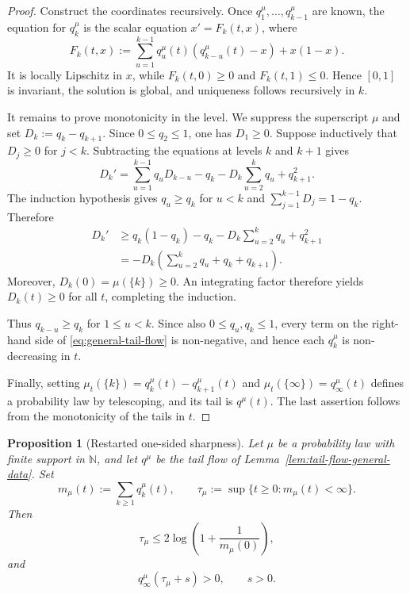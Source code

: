 \documentclass[11pt,a4paper]{amsart}
\newtheorem{proposition}[theorem]{Proposition}
\theoremstyle{remark}
\newcommand{\N}{\mathbb N}
\begin{document}
\begin{proof}
Construct the coordinates recursively. Once
$q_1^\mu,\ldots,q_{k-1}^\mu$ are known, the equation for $q_k^\mu$ is the
scalar equation $x'=F_k(t,x)$, where
\[
        F_k(t,x)
        :=
        \sum_{u=1}^{k-1}q_u^\mu(t)
        (q_{k-u}^\mu(t)-x)+x(1-x).
\]
It is locally Lipschitz in $x$, while
$F_k(t,0)\geq0$ and $F_k(t,1)\leq0$. Hence $[0,1]$ is invariant, the
solution is global, and uniqueness follows recursively in $k$.

It remains to prove monotonicity in the level. We suppress the superscript
$\mu$ and set $D_k:=q_k-q_{k+1}$. Since $0\leq q_2\leq1$, one has
$D_1\geq0$. Suppose inductively that $D_j\geq0$ for $j<k$. Subtracting
the equations at levels $k$ and $k+1$ gives
\[
        D_k'
        =
        \sum_{u=1}^{k-1}q_uD_{k-u}
        -q_k
        -D_k\sum_{u=2}^{k}q_u
        +q_{k+1}^2.
\]
The induction hypothesis gives \(q_u\geq q_k\) for \(u<k\) and
\(\sum_{j=1}^{k-1}D_j=1-q_k\). Therefore
\[
\begin{aligned}
D_k'
&\geq
q_k(1-q_k)-q_k
-D_k\sum_{u=2}^{k}q_u+q_{k+1}^2 \\
&=
-D_k\left(
\sum_{u=2}^{k}q_u+q_k+q_{k+1}\right).
\end{aligned}
\]
Moreover,
\(D_k(0)=\mu(\{k\})\geq0\). An integrating factor therefore yields
\(D_k(t)\geq0\) for all \(t\), completing the induction.

Thus \(q_{k-u}\geq q_k\) for \(1\leq u<k\). Since also
\(0\leq q_u,q_k\leq1\), every term on the right-hand side of
\eqref{eq:general-tail-flow} is non-negative, and hence each
\(q_k^\mu\) is non-decreasing in \(t\).


Finally, setting
$\mu_t(\{k\})=q_k^\mu(t)-q_{k+1}^\mu(t)$ and
$\mu_t(\{\infty\})=q_\infty^\mu(t)$ defines a probability law by
telescoping, and its tail is $q^\mu(t)$. The last assertion follows from
the monotonicity of the tails in $t$.
\end{proof}

\begin{proposition}[Restarted one-sided sharpness]
\label{prop:restarted-one-sided}
Let $\mu$ be a probability law with finite support in $\N$, and let
$q^\mu$ be the tail flow of Lemma~\ref{lem:tail-flow-general-data}. Set
\[
        m_\mu(t):=\sum_{k\geq1}q_k^\mu(t),
        \qquad
        \tau_\mu:=\sup\{t\geq0:m_\mu(t)<\infty\}.
\]
Then
\begin{equation}
\label{eq:restarted-susceptibility-bound}
        \tau_\mu
        \leq
        2\log\left(1+\frac1{m_\mu(0)}\right),
\end{equation}
and
\begin{equation}
\label{eq:restarted-postcritical-explosion}
        q_\infty^\mu(\tau_\mu+s)>0,
        \qquad s>0.
\end{equation}
\end{proposition}
\end{document}
